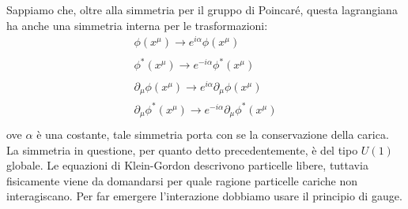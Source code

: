 Sappiamo che, oltre alla simmetria per il gruppo di Poincaré, questa lagrangiana ha anche una simmetria interna per le trasformazioni:
\begin{equation}
\begin{gathered}
    \phi(x^\mu)\xrightarrow[\text{}]{\text{}}e^{i\alpha}\phi(x^\mu)\\
    \phi^*(x^\mu)\xrightarrow[\text{}]{\text{}}e^{-i\alpha}\phi^*(x^\mu)\\
    \partial_\mu \phi(x^\mu)\xrightarrow[\text{}]{\text{}}e^{i\alpha}\partial_\mu\phi(x^\mu)\\
   \partial_\mu \phi^*(x^\mu)\xrightarrow[\text{}]{\text{}}e^{-i\alpha}\partial_\mu\phi^*(x^\mu)\\
\end{gathered}
\end{equation}
ove $\alpha$ è una costante, tale simmetria porta con se la conservazione della carica. La simmetria in questione, per quanto detto precedentemente, è del tipo $U(1)$ globale. Le equazioni di Klein-Gordon descrivono particelle libere, tuttavia fisicamente viene da domandarsi per quale ragione particelle cariche non interagiscano. Per far emergere l'interazione dobbiamo usare il principio di gauge.

